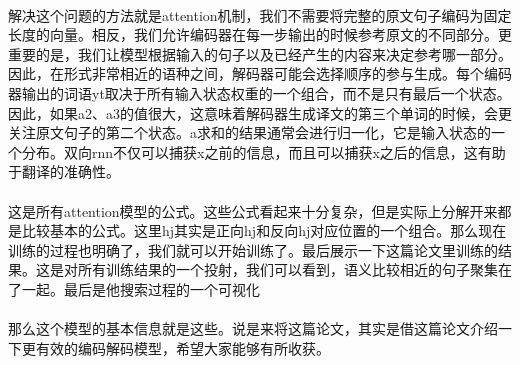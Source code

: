 \documentclass[UTF8]{ctexart}
\begin{document}
			\paragraph{}
			解决这个问题的方法就是attention机制，我们不需要将完整的原文句子编码为固定长度的向量。相反，我们允许编码器在每一步输出的时候参考原文的不同部分。更重要的是，我们让模型根据输入的句子以及已经产生的内容来决定参考哪一部分。因此，在形式非常相近的语种之间，解码器可能会选择顺序的参与生成。每个编码器输出的词语yt取决于所有输入状态权重的一个组合，而不是只有最后一个状态。因此，如果a2、a3的值很大，这意味着解码器生成译文的第三个单词的时候，会更关注原文句子的第二个状态。a求和的结果通常会进行归一化，它是输入状态的一个分布。双向rnn不仅可以捕获x之前的信息，而且可以捕获x之后的信息，这有助于翻译的准确性。
			\paragraph{}
			这是所有attention模型的公式。这些公式看起来十分复杂，但是实际上分解开来都是比较基本的公式。这里hj其实是正向hj和反向hj对应位置的一个组合。那么现在训练的过程也明确了，我们就可以开始训练了。最后展示一下这篇论文里训练的结果。这是对所有训练结果的一个投射，我们可以看到，语义比较相近的句子聚集在了一起。最后是他搜索过程的一个可视化
			\paragraph{}
			那么这个模型的基本信息就是这些。说是来将这篇论文，其实是借这篇论文介绍一下更有效的编码解码模型，希望大家能够有所收获。
\end{document}
